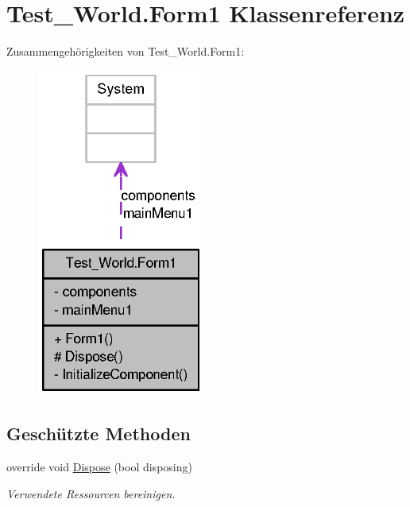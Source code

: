 \hypertarget{class_test___world_1_1_form1}{
\section{Test\_\-World.Form1 Klassenreferenz}
\label{class_test___world_1_1_form1}
}


Zusammengehörigkeiten von Test\_\-World.Form1:\nopagebreak
\begin{figure}[H]
\begin{center}
\leavevmode
\includegraphics[width=156pt]{class_test___world_1_1_form1__coll__graph}
\end{center}
\end{figure}
\subsection*{Geschützte Methoden}
\begin{DoxyCompactItemize}
\item 
override void \hyperlink{class_test___world_1_1_form1_a76e28105467035fd345da22985304e4b}{Dispose} (bool disposing)
\begin{DoxyCompactList}\small\item\em Verwendete Ressourcen bereinigen. \item\end{DoxyCompactList}\end{DoxyCompactItemize}


